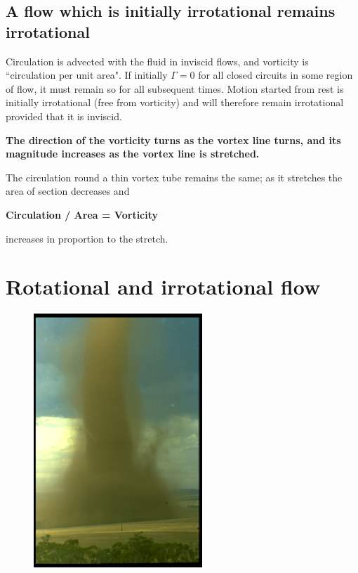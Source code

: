\documentclass[twoside,a4paper,11pt]{report}
\begin{document}
\subsection{A flow which is initially irrotational remains irrotational}

Circulation is advected with the fluid in inviscid flows, and vorticity is 
``circulation per unit area". If initially $\Gamma = 0$ for all closed 
circuits in some region of flow, it must remain so for all subsequent times. 
Motion started from rest is initially irrotational (free from vorticity) and 
will therefore remain irrotational provided that it is inviscid.

\begin{center}
\textbf{The direction of the vorticity turns as the vortex line turns, and 
its magnitude increases as the vortex line is stretched.}
\end{center}

The circulation round a thin vortex tube remains the same; as it stretches 
the area of section decreases and
\begin{center}
\textbf{Circulation / Area = Vorticity}
\end{center}
increases in proportion to the stretch.

\section{Rotational and irrotational flow}

\begin{figure}
\centerline{\includegraphics[width=2.5in]{Section46.pdf}}
\label{fig6}
\end{figure}
\end{document}
